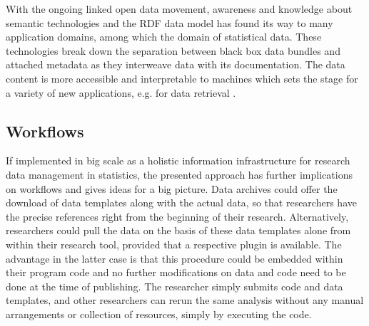 \documentclass{sig-alternate}
\begin{document}
With the ongoing linked open data movement, awareness and knowledge about semantic technologies and the RDF data model has found its way to many application domains, among which the domain of statistical data\cite{Halb_LDOW08}.
These technologies break down the separation between black box data bundles and attached metadata as they interweave data with its documentation.
The data content is more accessible and interpretable to machines which sets the stage for a variety of new applications, e.g. for data retrieval \cite{BahlsTochtermann_2012}.







\subsection{Workflows}

%
%

If implemented in big scale as a holistic information infrastructure for research data management in statistics, the presented approach has further implications on workflows and gives ideas for a big picture.
Data archives could offer the download of data templates along with the actual data, so that researchers have the precise references right from the beginning of their research.
Alternatively, researchers could pull the data on the basis of these data templates alone from within their research tool, provided that a respective plugin is available.
The advantage in the latter case is that this procedure could be embedded within their program code and no further modifications on data and code need to be done at the time of publishing.
The researcher simply submits code and data templates, and other researchers can rerun the same analysis without any manual arrangements or collection of resources, simply by executing the code.
\end{document}
